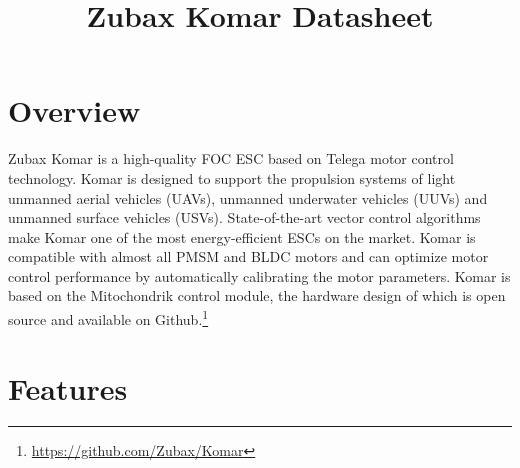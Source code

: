 \documentclass{zubaxdoc}
\title{Zubax Komar Datasheet}
\begin{document}
\frontmatter
\begin{titlepage}

\section*{Overview}

Zubax Komar is a high-quality FOC ESC based on Telega motor control technology. Komar is designed to
support the propulsion systems of light unmanned aerial vehicles (UAVs), unmanned underwater vehicles (UUVs)
and unmanned surface vehicles (USVs). State-of-the-art vector control algorithms make Komar one of the most
energy-efficient ESCs on the market. Komar is compatible with almost all PMSM and BLDC motors and can
optimize motor control performance by automatically calibrating the motor parameters. Komar is based
on the Mitochondrik control module, the hardware design of which is open source and available on
Github.\footnote{\url{https://github.com/Zubax/Komar}}


\section*{Features}


\end{titlepage}
\end{document}

